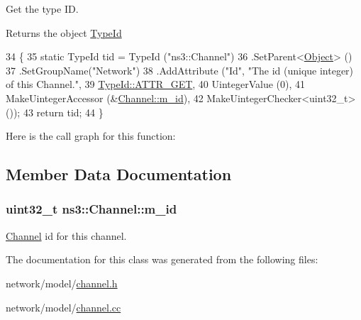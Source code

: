 Get the type ID. 

\begin{DoxyReturn}{Returns}
the object \hyperlink{classns3_1_1TypeId}{Type\+Id} 
\end{DoxyReturn}

\begin{DoxyCode}
34 \{
35   \textcolor{keyword}{static} TypeId tid = TypeId (\textcolor{stringliteral}{"ns3::Channel"})
36     .SetParent<\hyperlink{classns3_1_1Object_a40860402e64d8008fb42329df7097cdb}{Object}> ()
37     .SetGroupName(\textcolor{stringliteral}{"Network"})
38     .AddAttribute (\textcolor{stringliteral}{"Id"}, \textcolor{stringliteral}{"The id (unique integer) of this Channel."},
39                    \hyperlink{classns3_1_1TypeId_a3ab7b43b95f96391c514d609ca60e542a3dd4b476c9b257285c177d6c414b5fd0}{TypeId::ATTR\_GET},
40                    UintegerValue (0),
41                    MakeUintegerAccessor (&\hyperlink{classns3_1_1Channel_a3001ab37114cb1fe5b9fce23a627b78b}{Channel::m\_id}),
42                    MakeUintegerChecker<uint32\_t> ());
43   \textcolor{keywordflow}{return} tid;
44 \}
\end{DoxyCode}


Here is the call graph for this function\+:




\subsection{Member Data Documentation}
\subsubsection[{\texorpdfstring{m\+\_\+id}{m_id}}]{\setlength{\rightskip}{0pt plus 5cm}uint32\+\_\+t ns3\+::\+Channel\+::m\+\_\+id\hspace{0.3cm}{\ttfamily [private]}}\hypertarget{classns3_1_1Channel_a3001ab37114cb1fe5b9fce23a627b78b}{}\label{classns3_1_1Channel_a3001ab37114cb1fe5b9fce23a627b78b}


\hyperlink{classns3_1_1Channel}{Channel} id for this channel. 



The documentation for this class was generated from the following files\+:\begin{DoxyCompactItemize}
\item 
network/model/\hyperlink{channel_8h}{channel.\+h}\item 
network/model/\hyperlink{channel_8cc}{channel.\+cc}\end{DoxyCompactItemize}
